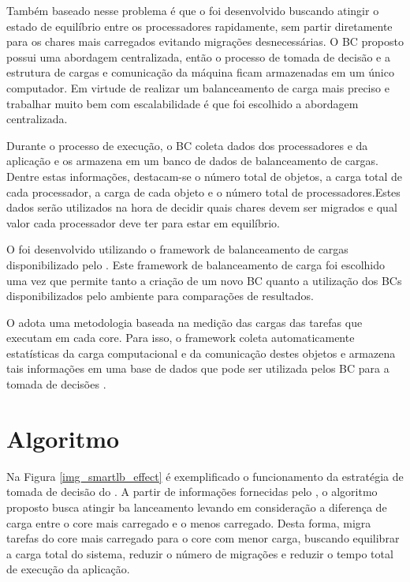 Também baseado nesse problema é que o \newlb foi desenvolvido buscando atingir o estado de equilíbrio entre os processadores rapidamente, sem partir diretamente para os chares mais carregados evitando migrações desnecessárias. O BC proposto possui uma abordagem centralizada, então o processo de tomada de decisão e a estrutura de cargas e comunicação da máquina ficam armazenadas em um único computador. Em virtude de realizar um balanceamento de carga mais preciso e trabalhar muito bem com escalabilidade é que foi escolhido a abordagem centralizada.

Durante o processo de execução, o BC coleta dados dos processadores e da aplicação
e os armazena em um banco de dados de balanceamento de cargas. Dentre estas informações,
destacam-se o número total de objetos, a carga total de cada processador, a carga de cada
objeto e o número total de processadores.Estes dados serão utilizados na hora de decidir quais chares devem ser migrados e qual valor cada processador deve ter para estar em equilíbrio.

O \newlb foi desenvolvido utilizando o framework de balanceamento de cargas disponibilizado pelo \charm. Este framework de balanceamento de carga foi escolhido uma vez que permite tanto a criação de um novo BC quanto a utilização dos BCs disponibilizados pelo ambiente para comparações de resultados.

O \charm adota uma metodologia baseada na medição das cargas das tarefas que executam em cada core. Para isso, o framework coleta automaticamente estatísticas da carga computacional e da comunicação destes objetos e armazena tais informações em uma base de dados que pode ser utilizada pelos BC para a tomada de decisões \cite{jyothi2004debugging}.


\section{Algoritmo}

Na Figura \ref{img_smartlb_effect} é exemplificado o funcionamento da estratégia de tomada de decisão do \newlb. A partir de informações fornecidas pelo \charm, o algoritmo proposto busca atingir ba lanceamento levando em consideração a diferença de carga entre o core mais carregado e o menos carregado. Desta forma, migra tarefas do core mais carregado para o core com menor carga, buscando equilibrar a carga total do sistema, reduzir o número de migrações e reduzir o tempo total de execução da aplicação.

